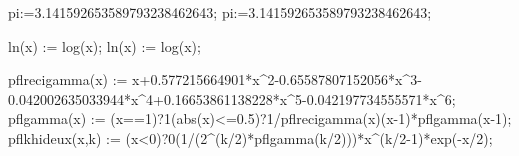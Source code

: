 
\xintdefvar pi:=3.141592653589793238462643;
\xintdeffloatvar pi:=3.141592653589793238462643;

\xintdeffunc ln(x) := log(x);
\xintdeffloatfunc ln(x) := log(x);

\xintdeffloatfunc pflrecigamma(x) := x+0.577215664901*x^2-0.65587807152056*x^3-0.042002635033944*x^4+0.16653861138228*x^5-0.042197734555571*x^6;
\xintdeffloatfunc pflgamma(x) := (x==1)?{1}{(abs(x)<=0.5)?{1/pflrecigamma(x)}{(x-1)*pflgamma(x-1)}};
\xintdeffloatfunc pflkhideux(x,k) := (x<0)?{0}{(1/(2^(k/2)*pflgamma(k/2)))*x^(k/2-1)*exp(-x/2)};

\NewDocumentCommand{}

\NewDocumentCommand{}

\NewDocumentCommand{}

\NewDocumentCommand{}

\NewDocumentCommand{}

